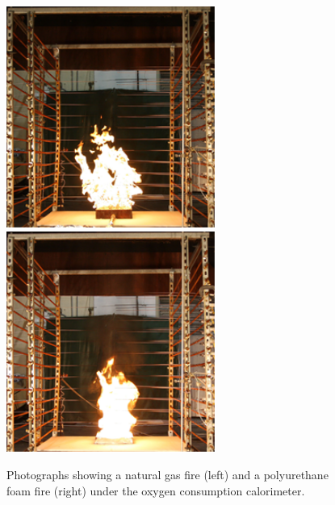 \documentclass[twoside]{uocthesis}
\begin{document}
{\begin{figure}
  \includegraphics[width=2.7in]{../Figures/Fig14a}
  \includegraphics[width=2.7in]{../Figures/Fig14b} \\
  \caption[Photographs of the natural gas and polyurethane foam fires]{Photographs showing a natural gas fire (left) and a polyurethane foam fire (right) under the oxygen consumption calorimeter.}
  \label{Gas_Foam_Photos}
\end{figure}

}
\end{document}
